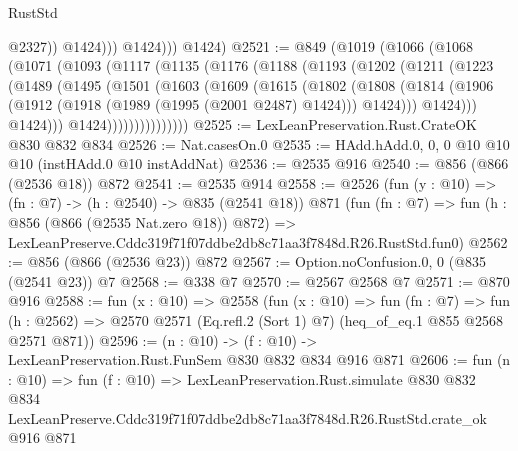 \begin{lexlean}{RustStd}
\begin{coremodule}
                      @2327))
                  @1424)))
            @1424)))
      @1424)
@2521 := @849
    (@1019
      (@1066
        (@1068
          (@1071
            (@1093
              (@1117
                (@1135
                  (@1176
                    (@1188
                      (@1193
                        (@1202
                          (@1211
                            (@1223
                              (@1489
                                (@1495
                                  (@1501
                                    (@1603
                                      (@1609
                                        (@1615
                                          (@1802
                                            (@1808
                                              (@1814
                                                (@1906
                                                  (@1912
                                                    (@1918 (@1989 (@1995 (@2001 @2487) @1424)))
                                                    @1424)))
                                              @1424)))
                                        @1424)))
                                  @1424)))))))))))))))
@2525 := LexLeanPreservation.Rust.CrateOK @830 @832 @834
@2526 := Nat.casesOn.{0}
@2535 := HAdd.hAdd.{0, 0, 0} @10 @10 @10 (instHAdd.{0} @10 instAddNat)
@2536 := @2535 @916
@2540 := @856 (@866 (@2536 @18)) @872
@2541 := @2535 @914
@2558 := @2526
    (fun (y : @10) => (fn : @7) -> (h : @2540) -> @835 (@2541 @18))
    @871
    (fun (fn : @7) =>
    fun (h : @856 (@866 (@2535 Nat.zero @18)) @872) =>
    LexLeanPreserve.Cddc319f71f07ddbe2db8c71aa3f7848d.R26.RustStd.fun0)
@2562 := @856 (@866 (@2536 @23)) @872
@2567 := Option.noConfusion.{0, 0} (@835 (@2541 @23)) @7
@2568 := @338 @7
@2570 := @2567 @2568 @7
@2571 := @870 @916
@2588 := fun (x : @10) =>
  @2558
    (fun (x : @10) =>
    fun (fn : @7) =>
    fun (h : @2562) => @2570 @2571 (Eq.refl.{2} (Sort 1) @7) (heq_of_eq.{1} @855 @2568 @2571 @871))
@2596 := (n : @10) -> (f : @10) -> LexLeanPreservation.Rust.FunSem @830 @832 @834 @916 @871
@2606 := fun (n : @10) =>
  fun (f : @10) =>
  LexLeanPreservation.Rust.simulate
    @830
    @832
    @834
    LexLeanPreserve.Cddc319f71f07ddbe2db8c71aa3f7848d.R26.RustStd.crate_ok
    @916
    @871
\end{coremodule}
\end{lexlean}
